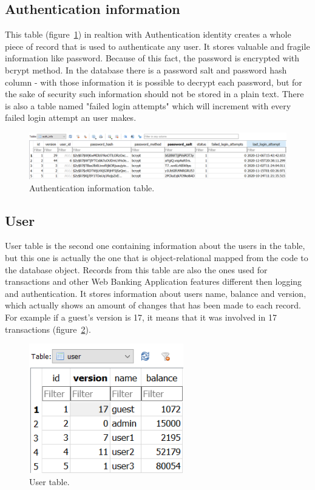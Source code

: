 \documentclass[a4paper,12pt]{book}
\begin{document}
\subsection*{Authentication information}
{
This table (figure~\ref{fig:secondtable}) in realtion with Authentication identity creates a whole piece of record that is used to authenticate any user. It stores valuable and fragile information like password. Because of this fact, the password is encrypted with bcrypt method. In the database there is a password salt and password hash column - with those information it is possible to decrypt each password, but for the sake of security such information should not be stored in a plain text. There is also a table named "failed login attempts" which will increment with every failed login attempt an user makes.

\begin{figure}[H]
\centering
\includegraphics[width=1.0\textwidth]{auth_info}
\caption{Authentication information table.}
\label{fig:secondtable}
\end{figure}

}

\subsection*{User}
{
User table is the second one containing information about the users in the table, but this one is actually the one that is object-relational mapped from the code to the database object. Records from this table are also the ones used for transactions and other Web Banking Application features different then logging and authentication. It stores information about users name, balance and version, which actually shows an amount of changes that has been made to each record. For example if a guest's version is 17, it means that it was involved in 17 transactions (figure~\ref{fig:version}).

\begin{figure}[H]
\centering
\includegraphics[width=0.6\textwidth]{user}
\caption{User table.}
\label{fig:version}
\end{figure}
}
\end{document}
